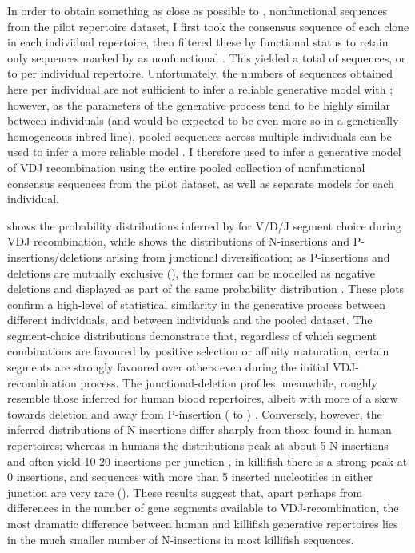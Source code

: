 In order to obtain something as close as possible to \naive, nonfunctional sequences from the pilot repertoire dataset, I first took the consensus sequence of each clone in each individual repertoire, then filtered these by functional status to retain only sequences marked by  as nonfunctional . This yielded a total of  sequences, or  to  per individual repertoire. Unfortunately, the numbers of sequences obtained here per individual are not sufficient to infer a reliable generative model with  \parencite{marcou2018igor,marcou2019perscomm}; however, as the parameters of the generative process tend to be highly similar between individuals (and would be expected to be even more-so in a genetically-homogeneous inbred line), pooled sequences across multiple individuals can be used to infer a more reliable model \parencite{marcou2019perscomm}. I therefore used  to infer a generative model of VDJ recombination using the entire pooled collection of nonfunctional consensus sequences from the pilot dataset, as well as separate models for each individual. 

 shows the probability distributions inferred by  for V/D/J segment choice during VDJ recombination, while  shows the distributions of N-insertions and P-insertions/deletions arising from junctional diversification; as P-insertions and deletions are mutually exclusive (), the former can be modelled as negative deletions and displayed as part of the same probability distribution \parencite{elhanati2015model}. These plots confirm a high-level of statistical similarity in the generative process between different individuals, and between individuals and the pooled dataset. The segment-choice distributions demonstrate that, regardless of which segment combinations are favoured by positive selection or affinity maturation, certain segments are strongly favoured over others even during the initial VDJ-recombination process. The junctional-deletion profiles, meanwhile, roughly resemble those inferred for human blood repertoires, albeit with more of a skew towards deletion and away from P-insertion ( to ) \parencite{elhanati2015model}. Conversely, however, the inferred distributions of N-insertions differ sharply from those found in human repertoires: whereas in humans the distributions peak at about 5 N-insertions and often yield 10-20 insertions per junction \parencite{elhanati2015model}, in killifish there is a strong peak at 0 insertions, and sequences with more than 5 inserted nucleotides in either junction are very rare (). These results suggest that, apart perhaps from differences in the number of gene segments available to VDJ-recombination, the most dramatic difference between human and killifish generative repertoires lies in the much smaller number of N-insertions in most killifish sequences.


